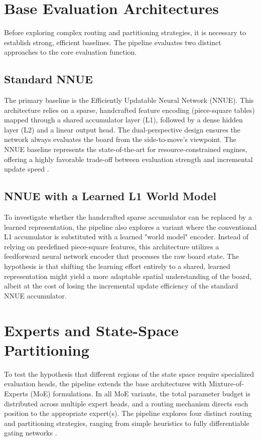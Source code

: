 \section{Base Evaluation Architectures}

Before exploring complex routing and partitioning strategies, it is necessary to establish strong, efficient baselines. The pipeline evaluates two distinct approaches to the core evaluation function.

\subsection{Standard NNUE}

The primary baseline is the Efficiently Updatable Neural Network (NNUE). This architecture relies on a sparse, handcrafted feature encoding (piece-square tables) mapped through a shared accumulator layer (L1), followed by a dense hidden layer (L2) and a linear output head. The dual-perspective design ensures the network always evaluates the board from the side-to-move's viewpoint. The NNUE baseline represents the state-of-the-art for resource-constrained engines, offering a highly favorable trade-off between evaluation strength and incremental update speed \parencite{nasu2018}.

\subsection{NNUE with a Learned L1 World Model}

To investigate whether the handcrafted sparse accumulator can be replaced by a learned representation, the pipeline also explores a variant where the conventional L1 accumulator is substituted with a learned "world model" encoder. Instead of relying on predefined piece-square features, this architecture utilizes a feedforward neural network encoder that processes the raw board state. The hypothesis is that shifting the learning effort entirely to a shared, learned representation might yield a more adaptable spatial understanding of the board, albeit at the cost of losing the incremental update efficiency of the standard NNUE accumulator.

\section{Experts and State-Space Partitioning}

To test the hypothesis that different regions of the state space require specialized evaluation heads, the pipeline extends the base architectures with Mixture-of-Experts (MoE) formulations. In all MoE variants, the total parameter budget is distributed across multiple expert heads, and a routing mechanism directs each position to the appropriate expert(s). The pipeline explores four distinct routing and partitioning strategies, ranging from simple heuristics to fully differentiable gating networks \parencite{shazeer2017}.

